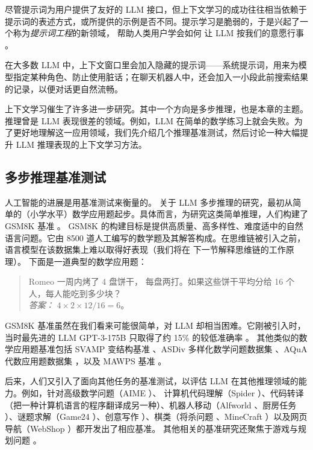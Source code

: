 尽管提示词为用户提供了友好的 LLM 接口，但上下文学习的成功往往相当依赖于提示词的表述方式，或所提供的示例是否不同。提示学习是脆弱的，于是兴起了一个称为{\em 提示词工程}的新领域，
帮助人类用户学会如何
让 LLM 按我们的意愿行事 \citep{radford2019language,wei2022emergent,giray2023prompt,sahoo2024systematic}。


在大多数 LLM 中，上下文窗口里会加入隐藏的提示词——系统提示词，用来为模型指定某种角色、防止使用脏话；在聊天机器人中，还会加入一小段此前搜索结果的记录，以便对话更自然流畅。

上下文学习催生了许多进一步研究。其中一个方向是多步推理，也是本章的主题。推理曾是 LLM 表现很差的领域。例如，LLM 在简单的数学练习上就会失败。为了更好地理解这一应用领域，我们先介绍几个推理基准测试，然后讨论一种大幅提升 LLM 推理表现的上下文学习方法。

\subsection{多步推理基准测试}\label{sec:benchmarks}
人工智能的进展是用基准测试来衡量的。
关于 LLM 多步推理的研究，最初从简单的（小学水平）数学应用题起步。具体而言，为研究这类简单推理，人们构建了 GSM8K 基准 \citep{cobbe2021training}。
GSM8K 的构建目标是提供高质量、高多样性、难度适中的自然语言问题。它由 8500 道人工编写的数学题及其解答构成。在思维链被引入之前，语言模型在该数据集上难以取得好表现（我们将在%
下一节解释思维链的工作原理）。
下面是一道典型的数学应用题：
\begin{quotation}
  Romeo 一周内烤了 4 盘饼干，
每盘两打。如果这些饼干平均分给 16 个人，每人能吃到多少块？\\ 
{\em 答案：} $4\times 2\times 12/16=6$。 
\end{quotation}

GSM8K 基准虽然在我们看来可能很简单，对 LLM 却相当困难。它刚被引入时，当时最先进的 LLM GPT-3-175B 只取得了约 15\% 的较低准确率 \citep{wei2022chain}。
其他类似的数学应用题基准包括 SVAMP 变结构基准 \citep{patel2021nlp}、ASDiv 多样化数学问题数据集 \citep{miao2021diverse}、AQuA 代数应用题数据集 \citep{ling2017program}，以及 MAWPS 基准
\citep{koncel2016mawps}。

后来，人们又引入了面向其他任务的基准测试，以评估 LLM 在其他推理领域的能力。例如，针对高级数学问题（AIME \citep{codeforcesamerican}）、
计算机代码理解（Spider \citep{yu2018spider}）、代码转译（把一种计算机语言的程序翻译成另一种）\citep{roziere2020unsupervised}、机器人移动（Alfworld \citep{shridhar2020alfworld}、厨房任务 \citep{ahn2022can}）、谜题求解（Game24 \citep{yao2024tree}）、创意写作 \citep{yao2024tree}）、棋类（将杀问题 \citep{yang2024buffer}、MineCraft \citep{fan2022minedojo}）以及网页导航（WebShop \citep{yao2022webshop}）都开发出了相应基准。
其他相关的基准研究还聚焦于游戏与规划问题
\citep{ruoss2024lmact,paglieri2024balrog,wen2025thinkpatterns}。

